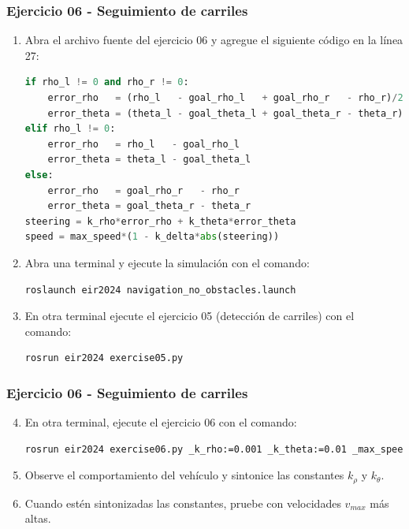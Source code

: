 \begin{frame}[containsverbatim]\frametitle{Ejercicio 06 - Seguimiento de carriles}
  \begin{enumerate}
  \item Abra el archivo fuente del ejercicio 06 y agregue el siguiente código en la línea 27:
    \begin{lstlisting}[language=Python, firstnumber=27]
if rho_l != 0 and rho_r != 0:
    error_rho   = (rho_l   - goal_rho_l   + goal_rho_r   - rho_r)/2
    error_theta = (theta_l - goal_theta_l + goal_theta_r - theta_r)/2
elif rho_l != 0:
    error_rho   = rho_l   - goal_rho_l  
    error_theta = theta_l - goal_theta_l
else:
    error_rho   = goal_rho_r   - rho_r  
    error_theta = goal_theta_r - theta_r
steering = k_rho*error_rho + k_theta*error_theta
speed = max_speed*(1 - k_delta*abs(steering))
    \end{lstlisting}
  \item Abra una terminal y ejecute la simulación con el comando:
    \begin{lstlisting}[language=bash,numbers=none]
roslaunch eir2024 navigation_no_obstacles.launch
    \end{lstlisting}
  \item En otra terminal ejecute el ejercicio 05 (detección de carriles) con el comando:
    \begin{lstlisting}[language=bash,numbers=none]
rosrun eir2024 exercise05.py 
    \end{lstlisting}
  \end{enumerate}
\end{frame}

\begin{frame}[containsverbatim]\frametitle{Ejercicio 06 - Seguimiento de carriles}
  \begin{enumerate}
    \setcounter{enumi}{3}
  \item En otra terminal, ejecute el ejercicio 06 con el comando:
    \begin{lstlisting}[language=bash,numbers=none]
rosrun eir2024 exercise06.py _k_rho:=0.001 _k_theta:=0.01 _max_speed:=20
    \end{lstlisting}
  \item Observe el comportamiento del vehículo y sintonice las constantes $k_\rho$ y $k_\theta$.
  \item Cuando estén sintonizadas las constantes, pruebe con velocidades $v_{max}$ más altas.
  \end{enumerate}
\end{frame}

